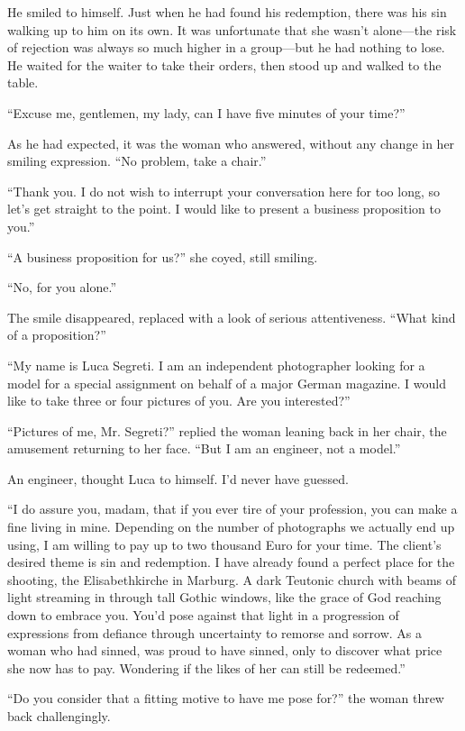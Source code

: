 He smiled to himself. Just when he had found his redemption, there was his sin walking up to him on its own. It was unfortunate that she wasn't alone---the risk of rejection was always so much higher in a group---but he had nothing to lose. He waited for the waiter to take their orders, then stood up and walked to the table.

``Excuse me, gentlemen, my lady, can I have five minutes of your time?''

As he had expected, it was the woman who answered, without any change in her smiling expression. ``No problem, take a chair.''

``Thank you. I do not wish to interrupt your conversation here for too long, so let's get straight to the point. I would like to present a business proposition to you.''

``A business proposition for us?'' she coyed, still smiling.

``No, for you alone.''

The smile disappeared, replaced with a look of serious attentiveness. ``What kind of a proposition?''

``My name is Luca Segreti. I am an independent photographer looking for a model for a special assignment on behalf of a major German magazine. I would like to take three or four pictures of you. Are you interested?''

``Pictures of me, Mr. Segreti?'' replied the woman leaning back in her chair, the amusement returning to her face. ``But I am an engineer, not a model.''

An engineer, thought Luca to himself. I'd never have guessed.

``I do assure you, madam, that if you ever tire of your profession, you can make a fine living in mine. Depending on the number of photographs we actually end up using, I am willing to pay up to two thousand Euro for your time. The client's desired theme is sin and redemption. I have already found a perfect place for the shooting, the Elisabethkirche in Marburg. A dark Teutonic church with beams of light streaming in through tall Gothic windows, like the grace of God reaching down to embrace you. You'd pose against that light in a progression of expressions from defiance through uncertainty to remorse and sorrow. As a woman who had sinned, was proud to have sinned, only to discover what price she now has to pay. Wondering if the likes of her can still be redeemed.''

``Do you consider that a fitting motive to have me pose for?'' the woman threw back challengingly.

